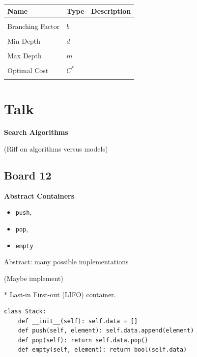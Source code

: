 \documentclass[10pt]{article}
\begin{document}
\air
\begin{center}
\begin{tabularx}{\linewidth}{llX}
  \toprule
  Name  & Type & Description \\
  \midrule
\\
 Branching Factor & $b$ & \censor{}  \\\\
 Min Depth &  $d$ & \censor{} \\\\
 Max Depth & $m$& \censor{} \\\\
 Optimal Cost & $C^*$& \censor{} \\\\
 \bottomrule
\end{tabularx}
\end{center}


\section{Talk}

\textbf{Search Algorithms}

(Riff on algorithms versus models)



\subsection{Board 12}

\textbf{Abstract Containers}

\begin{itemize}
\item \texttt{push}, 
\item \texttt{pop},
\item \texttt{empty}
\end{itemize}

Abstract: many possible implementations

(Maybe implement)

*  Last-in First-out (LIFO) container.  

\begin{lstlisting}
class Stack:
    def __init__(self): self.data = []
    def push(self, element): self.data.append(element)
    def pop(self): return self.data.pop() 
    def empty(self, element): return bool(self.data) 
\end{lstlisting}
\end{document}
